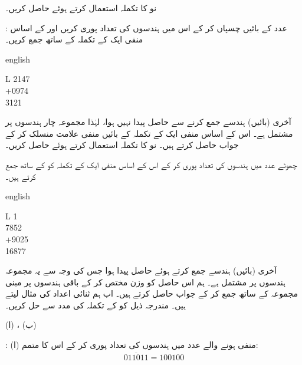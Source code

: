 نو کا تکملہ استعمال کرتے ہوئے  حاصل کریں۔ 

:\quad
 عدد  کے بائیں  چسپاں کر کے اس میں ہندسوں کی تعداد پوری کریں اور  کے اساس منفی ایک کے تکملہ کے ساتھ جمع کریں۔
  \begin{center}
\begin{otherlanguage*}{english}
\begin{LTR}
\begin{tabular}{L}
\phantom{+}2147\\
+0974\\
\midrule
\phantom{+}3121
\end{tabular}
\end{LTR}
\end{otherlanguage*}
\end{center}
آخری (بائیں) ہندسے جمع کرنے سے حاصل  پیدا نہیں ہوا، لہٰذا مجموعہ چار ہندسوں پر مشتمل ہے۔ اس کے اساس منفی ایک کے تکملہ  کے بائیں منفی علامت منسلک کر کے جواب  حاصل کرتے ہیں۔
نو کا تکملہ استعمال کرتے ہوئے  حاصل کریں۔ 

\quad
چھوٹے عدد  میں ہندسوں کی تعداد پوری کر کے اس کے اساس منفی ایک کے تکملہ  کو  کے ساتھ جمع کرتے ہیں۔
 \begin{center}
\begin{otherlanguage*}{english}
\begin{LTR}
\begin{tabular}{L}
\phantom{1}1\\
\phantom{+}7852\\
+9025\\
\midrule
\phantom{\,}16877
\end{tabular}
\end{LTR}
\end{otherlanguage*}
\end{center}
 آخری (بائیں) ہندسے جمع کرتے ہوئے حاصل  پیدا ہوا جس کی وجہ سے  یہ مجموعہ  ہندسوں پر مشتمل ہے۔ ہم اس حاصل  کو وزن  مختص کر کے باقی  ہندسوں پر مبنی مجموعہ  کے ساتھ جمع کر کے جواب  حاصل کرتے ہیں۔
اب ہم ثنائی اعداد کی مثال لیتے ہیں۔
 مندرجہ ذیل کو  کے تکملہ کی مدد سے حل کریں۔

(ا) ، (ب)  

:\quad
 (ا) منفی ہونے والے عدد میں ہندسوں کی تعداد پوری کر کے اس کا متمم:
 \begin{align*}
 \overline{011011}=100100
 \end{align*}

